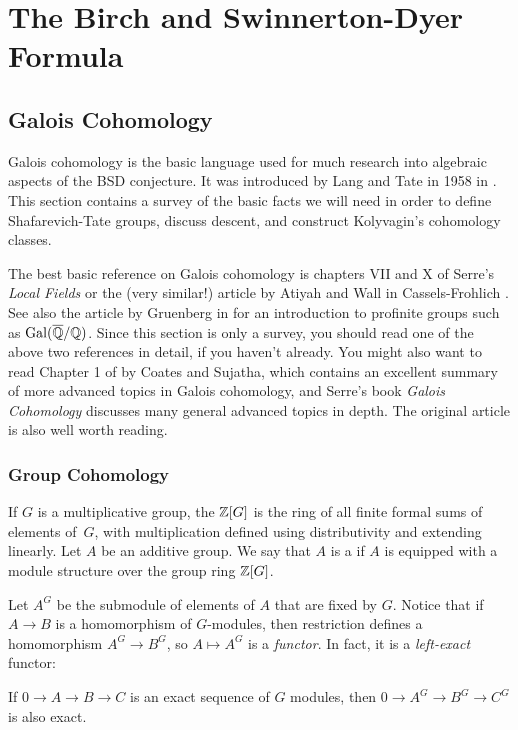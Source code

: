 \chapter{The Birch and Swinnerton-Dyer Formula}

\section{Galois Cohomology}
Galois cohomology is the basic language used for much research into
algebraic aspects of the BSD conjecture.  It was introduced by Lang
and Tate in 1958 in \cite{lang-tate}.  This section contains a survey
of the basic facts we will need in order to define Shafarevich-Tate
groups, discuss descent, and construct Kolyvagin's cohomology classes.

The best basic reference on Galois cohomology is chapters VII and X of
Serre's {\em Local Fields} \cite{serre:localfields} or the (very
similar!) article by Atiyah and Wall in Cassels-Frohlich
\cite[Ch.~IV]{cassels-frohlich}.  See also the article by Gruenberg in
\cite[Ch.~V]{cassels-frohlich} for an introduction to profinite groups such
as $\operatorname{Gal}(\overline{\mathbb{Q}}/\mathbb{Q})$.  Since this section is only a survey, you should
read one of the above two references in detail, if you haven't
already.  You might also want to read Chapter 1 of
\cite{coates-sujatha} by Coates and Sujatha, which contains an
excellent summary of more advanced topics in Galois cohomology, and
Serre's book {\em Galois Cohomology} \cite{serre:gc} discusses many
general advanced topics in depth.  The original article
\cite{lang-tate} is also well worth reading. 

\subsection{Group Cohomology}
If $G$ is a multiplicative group, the  $\mathbb{Z}[G]$ is
the ring of all finite formal sums of elements of~$G$, with
multiplication defined using distributivity and extending linearly.
Let $A$ be an additive group.  We say that $A$ is a 
if $A$ is equipped with a module structure over the group ring
$\mathbb{Z}[G]$.

Let $A^G$ be the submodule of elements of $A$ that are fixed by $G$.
Notice that if $A\to B$ is a homomorphism of $G$-modules, then
restriction defines a homomorphism $A^G \to B^G$, so $A\mapsto A^G$
is a {\em functor}.  In fact, it is a {\em left-exact} functor:
\begin{proposition}
  If $ 0 \to A \to B \to C$ is an exact sequence of $G$ modules, then
  $0 \to A^G \to B^G \to C^G$ is also exact.
\end{proposition}

